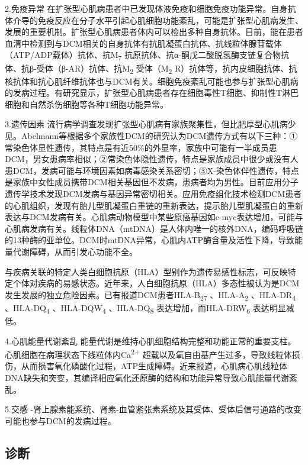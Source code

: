 2.免疫异常
在扩张型心肌病患者中已发现体液免疫和细胞免疫功能异常。自身抗体介导的免疫反应在分子水平引起心肌细胞功能紊乱，可能是扩张型心肌病发生、发展的重要机制。扩张型心肌病患者体内可以检出多种自身抗体。目前，能在患者血清中检测到与DCM相关的自身抗体有抗肌凝蛋白抗体、抗线粒体腺苷载体（ATP/ADP载体）抗体、抗M\textsubscript{7}
抗原抗体、抗α-酮戊二酸脱氢酶支链复合物抗体、抗β-受体（β-AR）抗体、抗M\textsubscript{2}
受体（M\textsubscript{2}
R）抗体等，抗内皮细胞抗体、抗核抗体和抗心肌纤维抗体也与DCM有关。细胞免疫紊乱可能也参与扩张型心肌病的发病过程。有研究显示，扩张型心肌病患者存在细胞毒性T细胞、抑制性T淋巴细胞和自然杀伤细胞等各种T细胞功能异常。

3.遗传因素
流行病学调查发现扩张型心肌病有家族聚集性，但比肥厚型心肌病少见。Abelmann等根据多个家族性DCM的研究认为DCM遗传方式有以下三种：①常染色体显性遗传，其特点是有近50\%的外显率，家族中可能有一半成员患DCM，男女患病率相似；②常染色体隐性遗传，特点是家族成员中很少或没有人患DCM，发病可能与环境因素如病毒感染关系密切；③X-染色体伴性遗传，特点是家族中女性成员携带DCM相关基因但不发病，患病者均为男性。目前应用分子遗传学技术发现DCM发病与基因异常密切相关。应用免疫组化技术检测DCM患者的心肌组织，发现有胎儿型肌凝蛋白重链的重新表达，提示胎儿型肌凝蛋白的重新表达与DCM发病有关。心肌病动物模型中某些原癌基因如c-myc表达增加，可能与心肌病发病有关。线粒体DNA（mtDNA）是人体内唯一的核外DNA，编码呼吸链的13种酶的亚单位。DCM时mtDNA异常，心肌内ATP酶含量及活性下降，导致能量代谢障碍，从而引发心功能不全。

与疾病关联的特定人类白细胞抗原（HLA）型别作为遗传易感性标志，可反映特定个体对疾病的易感状态。近年来，人白细胞抗原（HLA）多态性被认为是DCM发生发展的独立危险因素。已有报道DCM患者HLA-B\textsubscript{27}
、HLA-A\textsubscript{2} 、HLA-DR\textsubscript{4}
、HLA-DQ\textsubscript{4} 、HLA-DQW\textsubscript{4}
、HLA-DQ\textsubscript{8} 表达增加，而HLA-DRW\textsubscript{6}
表达明显减低。

4.心肌能量代谢紊乱
能量代谢是维持心肌细胞结构完整和功能正常的重要支柱。心肌细胞在病理状态下线粒体内Ca\textsuperscript{2+}
超载以及氧自由基产生过多，导致线粒体损伤，从而损害氧化磷酸化过程，ATP生成障碍。近来报道，心肌病心肌线粒体DNA缺失和突变，其编译相应氧化还原酶的结构和功能异常导致心肌能量代谢紊乱。

5.交感
-肾上腺素能系统、肾素-血管紧张素系统及其受体、受体后信号通路的改变可能也参与DCM的发病过程。

\subsection{诊断}

